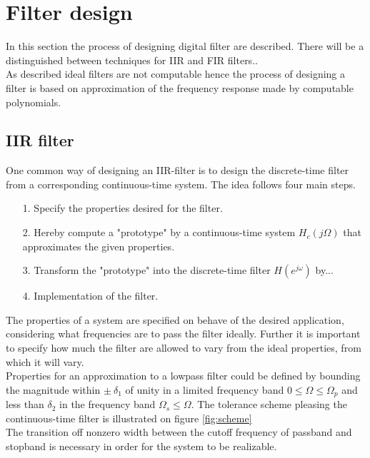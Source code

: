 \section{Filter design}
In this section the process of designing digital filter are described. There will be a distinguished between techniques for IIR and FIR filters..\\
As described ideal filters are not computable hence the process of designing a filter is based on approximation of the frequency response made by computable polynomials.  


\subsection{IIR filter}
One common way of designing an IIR-filter is to design the discrete-time filter from a corresponding continuous-time system. The idea follows four main steps. 
\begin{itemize}
\item[1.] Specify the properties desired for the filter.
\item[2.] Hereby compute a "prototype" by a continuous-time system $H_c(j\Omega)$ that approximates the given properties.
\item[3.] Transform the "prototype" into the discrete-time filter $H(e^{j\omega})$ by...
\item[4.] Implementation of the filter. 
\end{itemize}
The properties of a system are specified on behave of the desired application, considering what frequencies are to pass the filter ideally. Further it is important to specify how much the filter are allowed to vary from the ideal properties, from which it will vary. \\
Properties for an approximation to a lowpass filter could be defined by bounding the magnitude within $\pm \ \delta_1$ of unity in a limited frequency band $0 \leq \Omega \leq \Omega_p $ and less than $\delta_2$ in the frequency band $\Omega_s \leq \Omega$. 
The tolerance scheme pleasing the continuous-time filter is illustrated on figure \ref{fig:scheme}\\ 
The transition off nonzero width between the cutoff frequency of passband and stopband is necessary in order for the system to be realizable.


